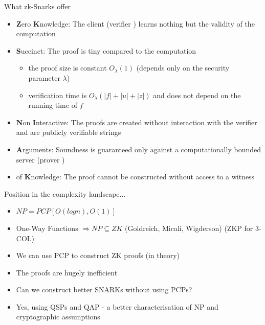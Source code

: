 \documentclass[handouts]{beamer}
\begin{document}
\begin{frame}{What zk-Snarks offer}
\begin{itemize}
    \item \textbf{Z}ero \textbf{K}nowledge: The client (verifier \ver) learns nothing but the validity of the computation \pause
    \item \textbf{S}uccinct: The proof is tiny compared to the computation \pause
    \begin{itemize}
        \item the proof size is constant $O_{\lambda}(1)$ (depends only on the security parameter $\lambda$)
        \item verification time is $O_{\lambda}(|f| + |u| + |z|)$ and does not depend on the running time of $f$
    \end{itemize} \pause
    \item \textbf{N}on \textbf{I}nteractive: The proofs are created without interaction with the verifier and are publicly verifiable strings \pause
    \item \textbf{A}rguments: Soundness is guaranteed only against a computationally bounded server (prover \prv) \pause
    \item of \textbf{K}nowledge: The proof cannot be constructed without access to a witness
\end{itemize}
\end{frame}

\begin{frame}{Position in the complexity landscape...}
    \begin{itemize}
        \item $NP = PCP[O(logn),O(1)]$ \pause
        \item One-Way Functions $ \Rightarrow NP \subseteq ZK$ (Goldreich, Micali, Wigderson) (ZKP for 3-COL) \pause
        \item We can use PCP to construct ZK proofs (in theory) \pause
        \item The proofs are hugely inefficient \pause
        \item Can we construct better SNARKs without using PCPs? \pause
        \item Yes, using QSPs and QAP - a better characterisation of NP and cryptographic assumptions
    \end{itemize}
\end{frame}
\end{document}
